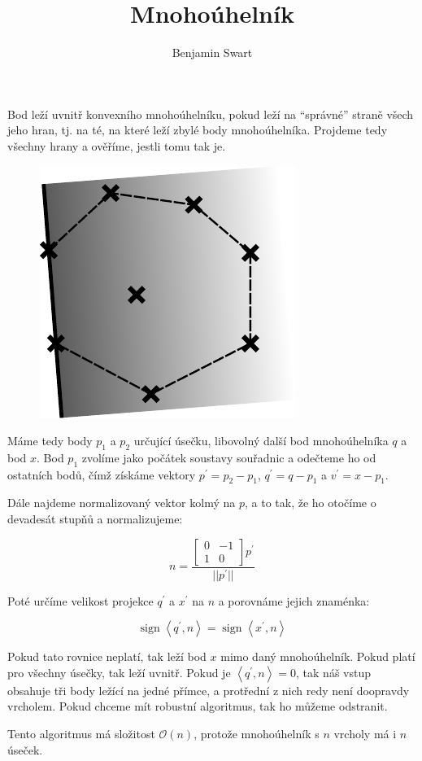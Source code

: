 \documentclass{article}
\title{Mnohoúhelník}
\author{Benjamin Swart}
\DeclareMathOperator{\sign}{sign}
\begin{document}
Bod leží uvnitř konvexního mnohoúhelníku, pokud leží na \enquote{správné} straně všech jeho hran, tj. na té, na které leží zbylé body mnohoúhelníka. Projdeme tedy všechny hrany a ověříme, jestli tomu tak je.

\begin{figure}[ht]
    \centering
    \includegraphics[scale=1.5]{polygon.pdf}
\end{figure}

Máme tedy body $p_1$ a $p_2$ určující úsečku, libovolný další bod mnohoúhelníka $q$ a bod $x$. Bod $p_1$ zvolíme jako počátek soustavy souřadnic a odečteme ho od ostatních bodů, čímž získáme vektory $p^\prime = p_2 - p_1$, $q^\prime = q - p_1$ a $v^\prime = x - p_1$.

Dále najdeme normalizovaný vektor kolmý na $p$, a to tak, že ho otočíme o devadesát stupňů a normalizujeme:

\begin{equation*}
    n = \frac{
        \begin{bmatrix}
            0 & -1 \\
            1 & 0
        \end{bmatrix} p^\prime
    }{||p^\prime||}
\end{equation*}

Poté určíme velikost projekce $q^\prime$ a $x^\prime$ na $n$ a porovnáme jejich znaménka:

\begin{equation*}
    \sign{\left<q^\prime, n\right>} = \sign{\left<x^\prime, n\right>}
\end{equation*}

Pokud tato rovnice neplatí, tak leží bod $x$ mimo daný mnohoúhelník. Pokud platí pro všechny úsečky, tak leží uvnitř. Pokud je $\left<q^\prime, n\right> = 0$, tak náš vstup obsahuje tři body ležící na jedné přímce, a protřední z nich redy není doopravdy vrcholem. Pokud chceme mít robustní algoritmus, tak ho můžeme odstranit.

Tento algoritmus má složitost $\mathcal{O}\left(n\right)$, protože mnohoúhelník s $n$ vrcholy má i $n$ úseček.
\end{document}
